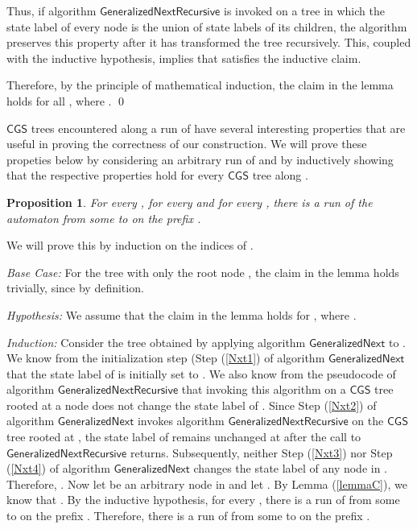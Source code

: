 \documentclass[3p]{elsarticle}
\newtheorem{proposition}[theorem]{Proposition}
\newcommand{\CGS}{\ensuremath{\textsf{CGS }}}
\newcommand{\algo}[1]{\ensuremath{\textsf{{#1}}}}
\begin{document}
Thus, if algorithm \algo{GeneralizedNextRecursive} is invoked on a
tree in which the state label of every node is the union of state
labels of its children, the algorithm preserves this property after it
has transformed the tree recursively.  This, coupled with the
inductive hypothesis, implies that  satisfies the
inductive claim.

Therefore, by the principle of mathematical induction, the claim in
the lemma holds for all , where .  \qed

\CGS trees encountered along a run of  have several interesting
properties that are useful in proving the correctness of our
construction.  We will prove these propeties below by considering an
arbitrary run  of  and by inductively
showing that the respective properties hold for every \CGS tree 
along .


\begin{proposition}\label{initialpath}
For every , for every  and for every , there is a run of the automaton  from some  to  on the prefix .
\end{proposition}
 We will prove this by induction on the indices
of .

\noindent \emph{Base Case:} For the tree  with only the root node
, the claim in the lemma holds trivially, since  by definition.

\noindent \emph{Hypothesis:} We assume that the claim in the lemma
holds for , where .

\noindent \emph{Induction:} Consider the tree  obtained by
applying algorithm \algo{GeneralizedNext} to .  We know from the
initialization step (Step (\ref{Nxt1}) of algorithm
\algo{GeneralizedNext} that the state label of  is initially
set to .  We also know from the
pseudocode of algorithm \algo{GeneralizedNextRecursive} that invoking
this algorithm on a \CGS tree rooted at a node  does not change the
state label of .  Since Step (\ref{Nxt2}) of algorithm
\algo{GeneralizedNext} invokes algorithm
\algo{GeneralizedNextRecursive} on the \CGS tree rooted at ,
the state label of  remains unchanged at
 after the call to
\algo{GeneralizedNextRecursive} returns.  Subsequently, neither Step
(\ref{Nxt3}) nor Step (\ref{Nxt4}) of algorithm \algo{GeneralizedNext}
changes the state label of any node in .  Therefore,
.  Now let
 be an arbitrary node in  and let .  By Lemma (\ref{lemmaC}), we know that .  By the
inductive hypothesis, for every , there is a
run of  from some  to  on the prefix .  Therefore, there is a run of  from some  to
 on the prefix .
\end{document}
